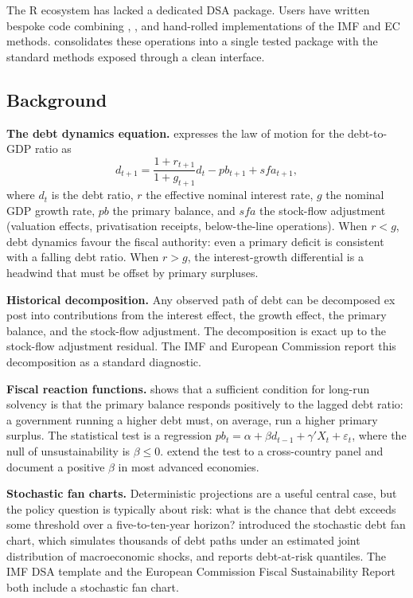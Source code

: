 The R ecosystem has lacked a dedicated DSA package. Users have written
bespoke code combining , , and
hand-rolled implementations of the IMF and EC methods. 
consolidates these operations into a single tested package with the
standard methods exposed through a clean interface.

\subsection{Background}\label{background}

\textbf{The debt dynamics equation.} \citet{blanchard1990} expresses the
law of motion for the debt-to-GDP ratio as
\[d_{t+1} = \frac{1 + r_{t+1}}{1 + g_{t+1}} d_t - pb_{t+1} + sfa_{t+1},\]
where \(d_t\) is the debt ratio, \(r\) the effective nominal interest
rate, \(g\) the nominal GDP growth rate, \(pb\) the primary balance, and
\(sfa\) the stock-flow adjustment (valuation effects, privatisation
receipts, below-the-line operations). When \(r < g\), debt dynamics
favour the fiscal authority: even a primary deficit is consistent with a
falling debt ratio. When \(r > g\), the interest-growth differential is
a headwind that must be offset by primary surpluses.

\textbf{Historical decomposition.} Any observed path of debt can be
decomposed ex post into contributions from the interest effect, the
growth effect, the primary balance, and the stock-flow adjustment. The
decomposition is exact up to the stock-flow adjustment residual. The IMF
and European Commission report this decomposition as a standard
diagnostic.

\textbf{Fiscal reaction functions.} \citet{bohn1998} shows that a
sufficient condition for long-run solvency is that the primary balance
responds positively to the lagged debt ratio: a government running a
higher debt must, on average, run a higher primary surplus. The
statistical test is a regression \(pb_t = \alpha + \beta d_{t-1} +
\gamma' X_t + \varepsilon_t\), where the null of unsustainability is
\(\beta \leq 0\). \citet{mendoza2008international} extend the test to a
cross-country panel and document a positive \(\beta\) in most advanced
economies.

\textbf{Stochastic fan charts.} Deterministic projections are a useful
central case, but the policy question is typically about risk: what is
the chance that debt exceeds some threshold over a five-to-ten-year
horizon? \citet{celasun2006primary} introduced the stochastic debt fan
chart, which simulates thousands of debt paths under an estimated joint
distribution of macroeconomic shocks, and reports debt-at-risk
quantiles. The IMF DSA template and the European Commission Fiscal
Sustainability Report both include a stochastic fan chart.

